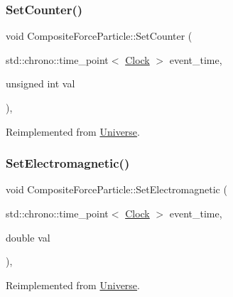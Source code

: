 \subsubsection{\texorpdfstring{Set\+Counter()}{SetCounter()}}
{\footnotesize\ttfamily void Composite\+Force\+Particle\+::\+Set\+Counter (\begin{DoxyParamCaption}\item[{std\+::chrono\+::time\+\_\+point$<$ \mbox{\hyperlink{universe_8h_a0ef8d951d1ca5ab3cfaf7ab4c7a6fd80}{Clock}} $>$}]{event\+\_\+time,  }\item[{unsigned int}]{val }\end{DoxyParamCaption})\hspace{0.3cm}{\ttfamily [inline]}, {\ttfamily [virtual]}}



Reimplemented from \mbox{\hyperlink{classUniverse_aa22202ae740eb1355529afcb13285e91}{Universe}}.

\mbox{\label{classCompositeForceParticle_a476c0d570c3be75c9e186df1ec2a5cda}} 
\subsubsection{\texorpdfstring{Set\+Electromagnetic()}{SetElectromagnetic()}}
{\footnotesize\ttfamily void Composite\+Force\+Particle\+::\+Set\+Electromagnetic (\begin{DoxyParamCaption}\item[{std\+::chrono\+::time\+\_\+point$<$ \mbox{\hyperlink{universe_8h_a0ef8d951d1ca5ab3cfaf7ab4c7a6fd80}{Clock}} $>$}]{event\+\_\+time,  }\item[{double}]{val }\end{DoxyParamCaption})\hspace{0.3cm}{\ttfamily [inline]}, {\ttfamily [virtual]}}



Reimplemented from \mbox{\hyperlink{classUniverse_aa981fc7e252b1fbbb675f0371860954d}{Universe}}.

\mbox{\label{classCompositeForceParticle_ad53c5d396b3c56241174a9bd78f9e07a}} 
